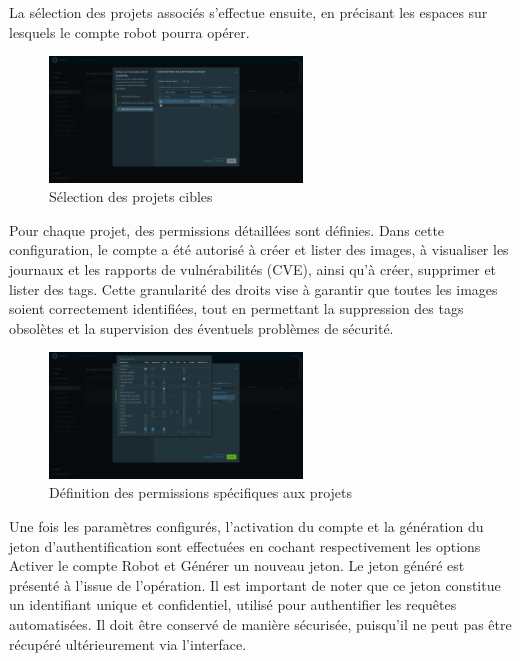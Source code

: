La sélection des projets associés s’effectue ensuite, en précisant les espaces sur lesquels le compte robot pourra opérer.

\begin{figure}[H]
	\centering
	\includegraphics[width=0.6\textwidth]{figures/harbor robot account projects.png}
	\caption{Sélection des projets cibles}
\end{figure}

Pour chaque projet, des permissions détaillées sont définies. Dans cette configuration, le compte a été autorisé à créer et lister des images, à visualiser les journaux et les rapports de vulnérabilités (CVE), ainsi qu’à créer, supprimer et lister des tags. Cette granularité des droits vise à garantir que toutes les images soient correctement identifiées, tout en permettant la suppression des tags obsolètes et la supervision des éventuels problèmes de sécurité.

\begin{figure}[H]
	\centering
	\includegraphics[width=0.6\textwidth]{figures/harbor robot account projects permissions.png}
	\caption{Définition des permissions spécifiques aux projets}
\end{figure}

Une fois les paramètres configurés, l’activation du compte et la génération du jeton d’authentification sont effectuées en cochant respectivement les options Activer le compte Robot et Générer un nouveau jeton. Le jeton généré est présenté à l’issue de l’opération. Il est important de noter que ce jeton constitue un identifiant unique et confidentiel, utilisé pour authentifier les requêtes automatisées. Il doit être conservé de manière sécurisée, puisqu’il ne peut pas être récupéré ultérieurement via l’interface.


